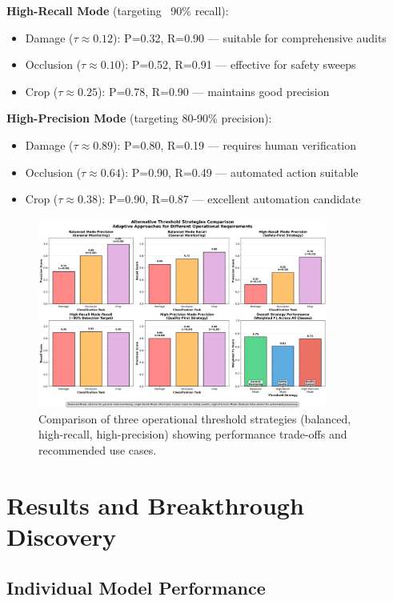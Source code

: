 \documentclass[12pt]{article}
\begin{document}
\textbf{High-Recall Mode} (targeting ~90\% recall):
\begin{itemize}[itemsep=1pt,parsep=0pt,topsep=2pt]
\item Damage ($\tau \approx 0.12$): P=0.32, R=0.90 — suitable for comprehensive audits
\item Occlusion ($\tau \approx 0.10$): P=0.52, R=0.91 — effective for safety sweeps
\item Crop ($\tau \approx 0.25$): P=0.78, R=0.90 — maintains good precision
\end{itemize}

\textbf{High-Precision Mode} (targeting 80-90\% precision):
\begin{itemize}[itemsep=1pt,parsep=0pt,topsep=2pt]
\item Damage ($\tau \approx 0.89$): P=0.80, R=0.19 — requires human verification
\item Occlusion ($\tau \approx 0.64$): P=0.90, R=0.49 — automated action suitable
\item Crop ($\tau \approx 0.38$): P=0.90, R=0.87 — excellent automation candidate
\end{itemize}

\begin{figure}[!htb]
\centering
\includegraphics[width=0.85\textwidth]{images/threshold_strategies_comparison.png}
\caption{Comparison of three operational threshold strategies (balanced, high-recall, high-precision) showing performance trade-offs and recommended use cases.}
\end{figure}

\section{Results and Breakthrough Discovery}

\subsection{Individual Model Performance}
\end{document}
